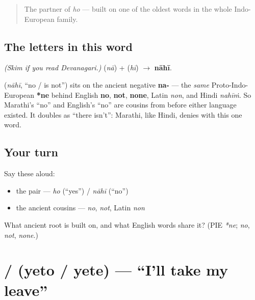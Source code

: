 \label{lesson:MR-C01-nahi}



\begin{quote}
The partner of \emph{ho} — built on one of the oldest words in the whole Indo-European family.
\end{quote}

\subsection*{The letters in this word}
\emph{(Skim if you read Devanagari.)} \textbf{} (\emph{nā}) + \textbf{} (\emph{hī}) $\to$ \textbf{nāhī}.

\begin{cousinweb}
\textbf{} (\emph{nāhī}, \textquotedblleft{}no / is not\textquotedblright{}) sits on the ancient negative \textbf{na-} — the \emph{same} Proto-Indo-European \textbf{*ne} behind English \textbf{no}, \textbf{not}, \textbf{none}, Latin \emph{non}, and Hindi \emph{nahīṁ}. So Marathi's \textquotedblleft{}no\textquotedblright{} and English's \textquotedblleft{}no\textquotedblright{} are cousins from before either language existed. It doubles as \textquotedblleft{}there isn't\textquotedblright{}: Marathi, like Hindi, denies with this one word.
\end{cousinweb}

\subsection*{Your turn}
Say these aloud:

\begin{itemize}
\raggedright
  \item the pair — \emph{ho} (\textquotedblleft{}yes\textquotedblright{}) / \emph{nāhī} (\textquotedblleft{}no\textquotedblright{})
  \item the ancient cousins — \emph{no}, \emph{not}, Latin \emph{non}
\end{itemize}

\begin{tcolorbox}[breakable,colback=teal!4,colframe=teal!35!black,title={Before you move on}]
What ancient root is \textbf{} built on, and what English words share it? (PIE \emph{*ne}; \emph{no}, \emph{not}, \emph{none}.)
\end{tcolorbox}
\section[yeto / yete]{ /  (yeto / yete) — \textquotedblleft{}I'll take my leave\textquotedblright{}}

